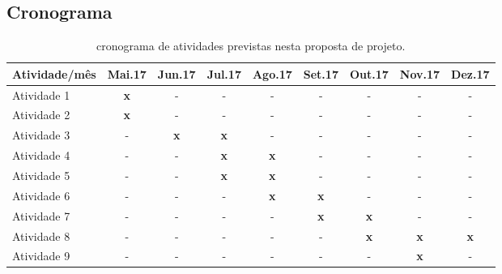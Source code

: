 \documentclass[12pt]{article}
\begin{document}
\subsection{Cronograma}
\begin{table}[!ht]
\caption{cronograma de atividades previstas nesta proposta de projeto.} 
\label{tab:cronograma}
\begin{center}
\smallskip
\begin{tabular}{l  cccccccc}
    \toprule
    \small Atividade/mês & \small Mai.17 & \small Jun.17 & \small Jul.17
                         & \small Ago.17 & \small Set.17 & \small Out.17
                         & \small Nov.17 & \small Dez.17
    \\ \hline

    \small Atividade 1   
    & \small {\bf x} & \small - & \small - & \small - & \small -
    & \small - & \small - & \small - \\
    

    \small Atividade 2   
    & \small {\bf x} & \small - & \small - & \small - & \small -
    & \small - & \small - & \small - \\

    \small Atividade 3   
    & \small - & \small {\bf x} & \small {\bf x} & \small - & \small -
    & \small - & \small - & \small - \\

    \small Atividade 4
    & \small - & \small - & \small {\bf x} & \small {\bf x} & \small -
    & \small - & \small - & \small - \\

    \small Atividade 5   
    & \small - & \small - & \small {\bf x} & \small {\bf x} & \small -
    & \small - & \small - & \small - \\

    \small Atividade 6   
    & \small - & \small - & \small - & \small {\bf x} & \small {\bf x}
    & \small - & \small - & \small - \\

    \small Atividade 7
    & \small - & \small - & \small - & \small - & {\bf x}
    & \small {\bf x} & \small - & \small - \\

    \small Atividade 8  
    & \small - & \small - & \small - & \small - & -
    & \small {\bf x} & \small {\bf x} & \small {\bf x} \\

    \small Atividade 9
    & \small - & \small - & \small - & \small - & \small -  
    & \small - & \small {\bf x} & \small - \\


\end{tabular}
\end{center}
\end{table}
\end{document}
